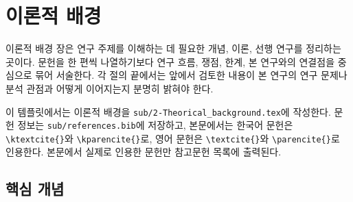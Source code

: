 \section{이론적 배경}

%
%
%

이론적 배경 장은 연구 주제를 이해하는 데 필요한 개념, 이론, 선행 연구를 정리하는 곳이다.
문헌을 한 편씩 나열하기보다 연구 흐름, 쟁점, 한계, 본 연구와의 연결점을 중심으로 묶어 서술한다.
각 절의 끝에서는 앞에서 검토한 내용이 본 연구의 연구 문제나 분석 관점과 어떻게 이어지는지 분명히 밝혀야 한다.

이 템플릿에서는 이론적 배경을 \verb|sub/2-Theorical_background.tex|에 작성한다.
문헌 정보는 \verb|sub/references.bib|에 저장하고, 본문에서는 한국어 문헌은 \verb|\ktextcite{}|와 \verb|\kparencite{}|로, 영어 문헌은 \verb|\textcite{}|와 \verb|\parencite{}|로 인용한다.
본문에서 실제로 인용한 문헌만 참고문헌 목록에 출력된다.

\subsection{핵심 개념}


